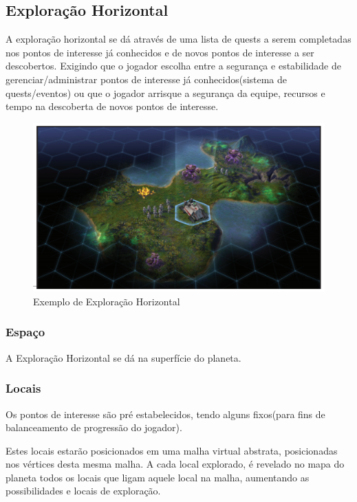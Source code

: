 \documentclass[11pt]{article} %
\begin{document}
\newpage

\subsection{Exploração Horizontal}
A exploração horizontal se dá através de uma lista de quests a serem completadas nos pontos de interesse já conhecidos e de novos pontos de interesse a ser descobertos. Exigindo que o jogador escolha entre a segurança e estabilidade de gerenciar/administrar pontos de interesse já conhecidos(sistema de quests/eventos) ou que o jogador arrisque a segurança da equipe, recursos e tempo na descoberta de novos pontos de interesse.

\begin{figure}[!htp]
\centering
\includegraphics[scale=0.3]{res/resources.png}
\caption{Exemplo de Exploração Horizontal}
\label{Exemplo de Exploração Horizontal}
\end{figure}

\subsubsection{Espaço}
A Exploração Horizontal se dá na superfície do planeta.
\subsubsection{Locais}
Os pontos de interesse são pré estabelecidos, tendo alguns fixos(para fins de balanceamento de progressão do jogador).

Estes locais estarão posicionados em uma malha virtual abstrata, posicionadas nos vértices desta mesma malha. A cada local explorado, é revelado no mapa do planeta todos os locais que ligam aquele local na malha, aumentando as possibilidades e locais de exploração.
\end{document}
